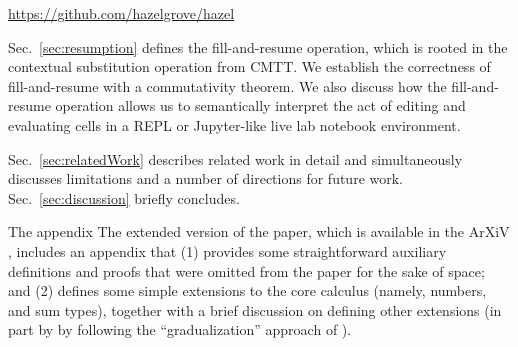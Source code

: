 \begin{center}
\url{https://github.com/hazelgrove/hazel}
\end{center}

Sec.~\ref{sec:resumption} defines the fill-and-resume operation, which is rooted in the contextual substitution operation from CMTT. We establish the correctness of fill-and-resume with a commutativity theorem. We also discuss how the fill-and-resume operation allows us to semantically interpret the act of editing and evaluating cells in a REPL or Jupyter-like live lab notebook environment.

Sec.~\ref{sec:relatedWork} describes related work in detail and simultaneously discusses limitations and a number of directions for future work. Sec.~\ref{sec:discussion} briefly concludes. 

\ifarxiv
The appendix 
\else
The extended version of the paper, which is available in the ArXiV \cite{2018arXiv180500155O}, includes an appendix that 
\fi
(1) provides some straightforward auxiliary definitions and proofs that were omitted from the paper for the sake of space; and (2) defines some simple extensions to the core calculus (namely, numbers, and sum types), together with a brief discussion on defining other extensions (in part by by following the ``gradualization'' approach of \citet{DBLP:conf/popl/CiminiS16}). 
